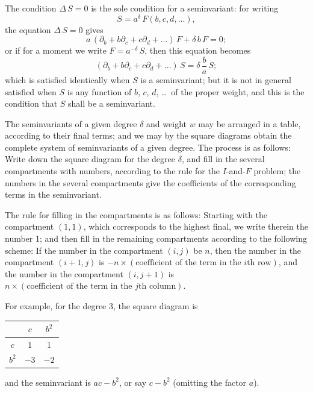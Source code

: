 \documentclass[11pt,a4paper]{book}
\begin{document}
\setcounter{art}{36}
\begin{art}
The condition $\Delta\,S = 0$ is the sole condition for a seminvariant: for writing
\[
S = a^{\delta}\,F(b, c, d, \ldots),
\]
the equation $\Delta\,S = 0$ gives
\[
a\,(\partial_{b} + b\partial_{c} + c\partial_{d} + \ldots)\,F + \delta\,b\,F = 0;
\]
or if for a moment we write $F = a^{-\delta}\,S$, then this equation becomes
\[
(\partial_{b} + b\partial_{c} + c\partial_{d} + \ldots)\,S = \delta\,\frac{b}{a}\,S;
\]
which is satisfied identically when $S$ is a seminvariant; but it is not in general satisfied when $S$ is any function of $b$, $c$, $d$, \ldots\ of the proper weight, and this is the condition that $S$ shall be a seminvariant.
\end{art}

\setcounter{art}{37}
\begin{art}
The seminvariants of a given degree $\delta$ and weight $w$ may be arranged in a table, according to their final terms; and we may by the square diagrams obtain the complete system of seminvariants of a given degree. The process is as follows: Write down the square diagram for the degree $\delta$, and fill in the several compartments with numbers, according to the rule for the $I$-and-$F$ problem; the numbers in the several compartments give the coefficients of the corresponding terms in the seminvariant.
\end{art}

\setcounter{art}{38}
\begin{art}
The rule for filling in the compartments is as follows: Starting with the compartment $(1, 1)$, which corresponds to the highest final, we write therein the number 1; and then fill in the remaining compartments according to the following scheme: If the number in the compartment $(i, j)$ be $n$, then the number in the compartment $(i + 1, j)$ is $-n \times (\text{coefficient of the term in the $i$th row})$, and the number in the compartment $(i, j + 1)$ is $n \times (\text{coefficient of the term in the $j$th column})$.
\end{art}

\setcounter{art}{39}
\begin{art}
For example, for the degree 3, the square diagram is
\begin{center}
\begin{tabular}{c|cc}
 & $c$ & $b^{2}$ \\
\hline
$c$ & $1$ & $1$ \\
$b^{2}$ & $-3$ & $-2$ \\
\end{tabular}
\end{center}
and the seminvariant is $ac - b^{2}$, or say $c - b^{2}$ (omitting the factor $a$).
\end{art}
\end{document}
